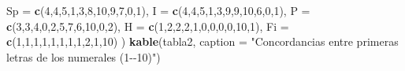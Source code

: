 \documentclass[
]{book}
\newenvironment{Shaded}{\begin{snugshade}}{\end{snugshade}}
\newcommand{\AttributeTok}[1]{\textcolor[rgb]{0.13,0.29,0.53}{#1}}
\newcommand{\DecValTok}[1]{\textcolor[rgb]{0.00,0.00,0.81}{#1}}
\newcommand{\FunctionTok}[1]{\textcolor[rgb]{0.13,0.29,0.53}{\textbf{#1}}}
\newcommand{\NormalTok}[1]{#1}
\newcommand{\StringTok}[1]{\textcolor[rgb]{0.31,0.60,0.02}{#1}}
\begin{document}
\begin{Shaded}
\begin{Highlighting}[]
  \AttributeTok{Sp =} \FunctionTok{c}\NormalTok{(}\DecValTok{4}\NormalTok{,}\DecValTok{4}\NormalTok{,}\DecValTok{5}\NormalTok{,}\DecValTok{1}\NormalTok{,}\DecValTok{3}\NormalTok{,}\DecValTok{8}\NormalTok{,}\DecValTok{10}\NormalTok{,}\DecValTok{9}\NormalTok{,}\DecValTok{7}\NormalTok{,}\DecValTok{0}\NormalTok{,}\DecValTok{1}\NormalTok{),}
  \AttributeTok{I  =} \FunctionTok{c}\NormalTok{(}\DecValTok{4}\NormalTok{,}\DecValTok{4}\NormalTok{,}\DecValTok{5}\NormalTok{,}\DecValTok{1}\NormalTok{,}\DecValTok{3}\NormalTok{,}\DecValTok{9}\NormalTok{,}\DecValTok{9}\NormalTok{,}\DecValTok{10}\NormalTok{,}\DecValTok{6}\NormalTok{,}\DecValTok{0}\NormalTok{,}\DecValTok{1}\NormalTok{),}
  \AttributeTok{P  =} \FunctionTok{c}\NormalTok{(}\DecValTok{3}\NormalTok{,}\DecValTok{3}\NormalTok{,}\DecValTok{4}\NormalTok{,}\DecValTok{0}\NormalTok{,}\DecValTok{2}\NormalTok{,}\DecValTok{5}\NormalTok{,}\DecValTok{7}\NormalTok{,}\DecValTok{6}\NormalTok{,}\DecValTok{10}\NormalTok{,}\DecValTok{0}\NormalTok{,}\DecValTok{2}\NormalTok{),}
  \AttributeTok{H  =} \FunctionTok{c}\NormalTok{(}\DecValTok{1}\NormalTok{,}\DecValTok{2}\NormalTok{,}\DecValTok{2}\NormalTok{,}\DecValTok{2}\NormalTok{,}\DecValTok{1}\NormalTok{,}\DecValTok{0}\NormalTok{,}\DecValTok{0}\NormalTok{,}\DecValTok{0}\NormalTok{,}\DecValTok{0}\NormalTok{,}\DecValTok{10}\NormalTok{,}\DecValTok{1}\NormalTok{),}
  \AttributeTok{Fi =} \FunctionTok{c}\NormalTok{(}\DecValTok{1}\NormalTok{,}\DecValTok{1}\NormalTok{,}\DecValTok{1}\NormalTok{,}\DecValTok{1}\NormalTok{,}\DecValTok{1}\NormalTok{,}\DecValTok{1}\NormalTok{,}\DecValTok{1}\NormalTok{,}\DecValTok{1}\NormalTok{,}\DecValTok{2}\NormalTok{,}\DecValTok{1}\NormalTok{,}\DecValTok{10}\NormalTok{)}
\NormalTok{)}
\FunctionTok{kable}\NormalTok{(tabla2, }\AttributeTok{caption =} \StringTok{"Concordancias entre primeras letras de los numerales (1{-}{-}10)"}\NormalTok{)}
\end{Highlighting}
\end{Shaded}
\end{document}
